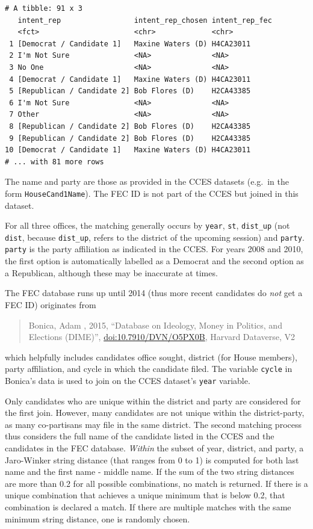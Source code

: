 \documentclass[10pt,article,oneside]{memoir}
\theoremstyle{definition}
\begin{document}
\begin{verbatim}
# A tibble: 91 x 3
   intent_rep                 intent_rep_chosen intent_rep_fec
   <fct>                      <chr>             <chr>         
 1 [Democrat / Candidate 1]   Maxine Waters (D) H4CA23011     
 2 I'm Not Sure               <NA>              <NA>          
 3 No One                     <NA>              <NA>          
 4 [Democrat / Candidate 1]   Maxine Waters (D) H4CA23011     
 5 [Republican / Candidate 2] Bob Flores (D)    H2CA43385     
 6 I'm Not Sure               <NA>              <NA>          
 7 Other                      <NA>              <NA>          
 8 [Republican / Candidate 2] Bob Flores (D)    H2CA43385     
 9 [Republican / Candidate 2] Bob Flores (D)    H2CA43385     
10 [Democrat / Candidate 1]   Maxine Waters (D) H4CA23011     
# ... with 81 more rows
\end{verbatim}

The name and party are those as provided in the CCES datasets (e.g.~in
the form \texttt{HouseCand1Name}). The FEC ID is not part of the CCES
but joined in this dataset.

For all three offices, the matching generally occurs by \texttt{year},
\texttt{st}, \texttt{dist\_up} (not \texttt{dist}, because
\texttt{dist\_up}, refers to the district of the upcoming session) and
\texttt{party}. \texttt{party} is the party affiliation as indicated in
the CCES. For years 2008 and 2010, the first option is automatically
labelled as a Democrat and the second option as a Republican, although
these may be inaccurate at times.

The FEC database runs up until 2014 (thus more recent candidates do
\emph{not} get a FEC ID) originates from

\begin{quote}
Bonica, Adam , 2015, ``Database on Ideology, Money in Politics, and
Elections (DIME)'', \url{doi:10.7910/DVN/O5PX0B}, Harvard Dataverse, V2
\end{quote}

which helpfully includes candidates office sought, district (for House
members), party affiliation, and cycle in which the candidate filed. The
variable \texttt{cycle} in Bonica's data is used to join on the CCES
dataset's \texttt{year} variable.

Only candidates who are unique within the district and party are
considered for the first join. However, many candidates are not unique
within the district-party, as many co-partisans may file in the same
district. The second matching process thus considers the full name of
the candidate listed in the CCES and the candidates in the FEC database.
\emph{Within} the subset of year, district, and party, a Jaro-Winker
string distance (that ranges from 0 to 1) is computed for both last name
and the first name - middle name. If the sum of the two string distances
are more than 0.2 for all possible combinations, no match is returned.
If there is a unique combination that achieves a unique minimum that is
below 0.2, that combination is declared a match. If there are multiple
matches with the same minimum string distance, one is randomly chosen.
\end{document}
